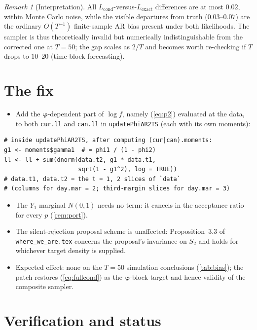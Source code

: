 \documentclass[11pt]{article}
\newcommand{\eref}[1]{(\ref{#1})}
\newcommand{\Lexact}{L_{\mathrm{exact}}}
\newcommand{\Lcond}{L_{\mathrm{cond}}}
\newcommand{\bphi}{\boldsymbol{\varphi}}
\theoremstyle{plain}
\theoremstyle{definition}
\theoremstyle{remark}
\newtheorem{remark}[proposition]{Remark}
\begin{document}
\begin{remark}[Interpretation]\label{rem:magnitude}
All $\Lcond$-versus-$\Lexact$ differences are at most $0.02$, within Monte
Carlo noise, while the visible departures from truth ($0.03$--$0.07$) are the
ordinary $O(T^{-1})$ finite-sample AR bias present under both likelihoods.
The sampler is thus theoretically invalid but numerically indistinguishable
from the corrected one at $T = 50$; the gap scales as $2/T$ and becomes
worth re-checking if $T$ drops to $10$--$20$ (time-block forecasting).
\end{remark}

\section{The fix}\label{sec:fix}

\begin{itemize}
  \item Add the $\bphi$-dependent part of $\log f$, namely
        \eref{eq:p2} evaluated at the data, to both \texttt{cur.ll} and
        \texttt{can.ll} in \texttt{updatePhiAR2TS} (each with its own
        moments):
\end{itemize}

\begin{lstlisting}
# inside updatePhiAR2TS, after computing (cur|can).moments:
g1 <- moments$gamma1  # = phi1 / (1 - phi2)
ll <- ll + sum(dnorm(data.t2, g1 * data.t1,
                     sqrt(1 - g1^2), log = TRUE))
# data.t1, data.t2 = the t = 1, 2 slices of `data`
# (columns for day.mar = 2; third-margin slices for day.mar = 3)
\end{lstlisting}

\begin{itemize}
  \item The $Y_1$ marginal $N(0, 1)$ needs no term: it cancels in the
        acceptance ratio for every $p$ (\cref{rem:port}).
  \item The silent-rejection proposal scheme is unaffected: Proposition~3.3
        of \texttt{where\_we\_are.tex} concerns the proposal's invariance on
        $S_2$ and holds for whichever target density is supplied.
  \item Expected effect: none on the $T = 50$ simulation conclusions
        (\cref{tab:bias}); the patch restores \eref{eq:fullcond} as the
        $\bphi$-block target and hence validity of the composite sampler.
\end{itemize}

\section{Verification and status}\label{sec:verify}
\end{document}

